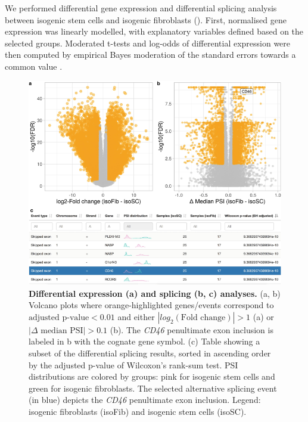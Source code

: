 We performed differential gene expression and differential splicing analysis between isogenic stem cells and isogenic fibroblasts (). First, normalised gene expression was linearly modelled, with explanatory variables defined based on the selected groups. Moderated t-tests and log-odds of differential expression were then computed by empirical Bayes moderation of the standard errors towards a common value \cite{ritchie:2015tm}.

\begin{figure}[!h]
  \includegraphics[width=.7\textwidth]{images/psichomics/6-diff-analyses}
  \centering
  \caption[Differential expression and splicing analyses]{\textbf{Differential expression (a) and splicing (b, c) analyses.} (a, b) Volcano plots where orange-highlighted genes/events correspond to $\textrm{adjusted p-value} < 0.01$ and either $|log_2(\textrm{Fold change})| > 1$ (a) or $|\Delta \textrm{ median PSI}| > 0.1$ (b). The \emph{CD46} penultimate exon inclusion is labeled in b with the cognate gene symbol. (c) Table showing a subset of the differential splicing results, sorted in ascending order by the adjusted p-value of Wilcoxon’s rank-sum test. PSI distributions are colored by groups: pink for isogenic stem cells and green for isogenic fibroblasts. The selected alternative splicing event (in blue) depicts the \emph{CD46} penultimate exon inclusion. Legend: isogenic fibroblasts (isoFib) and isogenic stem cells (isoSC).}
  \label{fig:psichomics-diff-analyses}
\end{figure}

